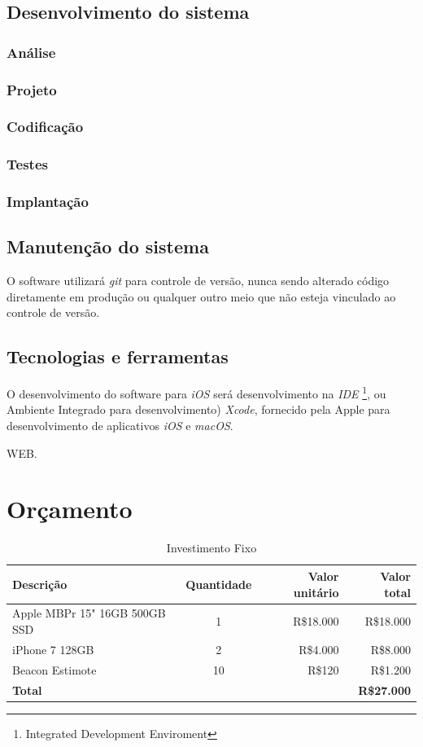 \documentclass[
	12pt,
	oneside,
	a4paper,
	english,
	brazil,
]{abntex2}
\begin{document}
\section{Desenvolvimento do sistema}
\subsection{Análise}
\subsection{Projeto}
\subsection{Codificação}
\subsection{Testes}
\subsection{Implantação}
\section{Manutenção do sistema}

O software utilizará \emph{git} para controle de versão, nunca sendo alterado código diretamente em produção ou qualquer outro meio que não esteja vinculado ao controle de versão.

\section{Tecnologias e ferramentas}

O desenvolvimento do software para \emph{iOS} será desenvolvimento na \emph{IDE} \footnote{Integrated Development Enviroment}, ou Ambiente Integrado para desenvolvimento) \emph{Xcode}, fornecido pela Apple para desenvolvimento de aplicativos \emph{iOS} e \emph{macOS}.

WEB.




\chapter{Orçamento}

\begin{table}[ht]
\caption{Investimento Fixo}
\centering
\begin{tabular}{l c r r}
\hline\hline
Descrição & Quantidade & Valor unitário & Valor total \\ [0.5ex]
\hline
Apple MBPr 15" 16GB 500GB SSD&1&R\$18.000&R\$18.000 \\
iPhone 7 128GB&2&R\$4.000&R\$8.000 \\
Beacon Estimote&10&R\$120&R\$1.200 \\ [1ex]
\hline
\textbf{Total}&&&\textbf{R\$27.000} \\ [1ex]
\end{tabular}
\label{table:nonlin}
\end{table}
\end{document}
